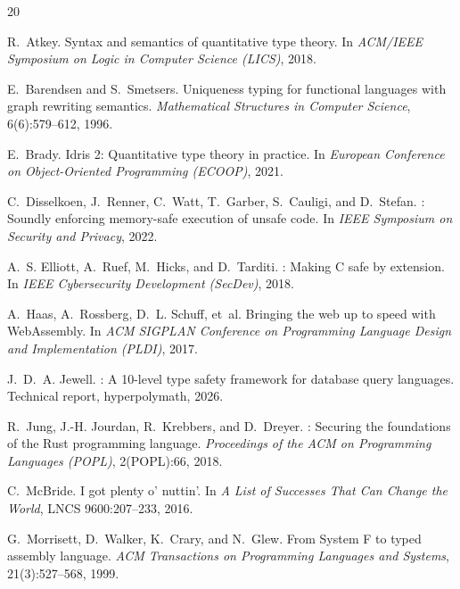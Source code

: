 \documentclass[11pt,a4paper]{article}
\begin{document}
\begin{thebibliography}{20}

R.~Atkey.
\newblock Syntax and semantics of quantitative type theory.
\newblock In \emph{ACM/IEEE Symposium on Logic in Computer Science (LICS)},
  2018.

E.~Barendsen and S.~Smetsers.
\newblock Uniqueness typing for functional languages with graph rewriting
  semantics.
\newblock \emph{Mathematical Structures in Computer Science}, 6(6):579--612,
  1996.

E.~Brady.
\newblock Idris 2: Quantitative type theory in practice.
\newblock In \emph{European Conference on Object-Oriented Programming (ECOOP)},
  2021.

C.~Disselkoen, J.~Renner, C.~Watt, T.~Garber, S.~Cauligi, and D.~Stefan.
: Soundly enforcing memory-safe execution of unsafe code.
\newblock In \emph{IEEE Symposium on Security and Privacy}, 2022.

A.~S. Elliott, A.~Ruef, M.~Hicks, and D.~Tarditi.
: Making {C} safe by extension.
\newblock In \emph{IEEE Cybersecurity Development (SecDev)}, 2018.

A.~Haas, A.~Rossberg, D.~L. Schuff, et~al.
\newblock Bringing the web up to speed with {WebAssembly}.
\newblock In \emph{ACM SIGPLAN Conference on Programming Language Design and
  Implementation (PLDI)}, 2017.

J.~D.~A. Jewell.
: A 10-level type safety framework for database query
  languages.
\newblock Technical report, hyperpolymath, 2026.

R.~Jung, J.-H. Jourdan, R.~Krebbers, and D.~Dreyer.
: Securing the foundations of the {Rust} programming
  language.
\newblock \emph{Proceedings of the ACM on Programming Languages (POPL)},
  2(POPL):66, 2018.

C.~McBride.
\newblock I got plenty o' nuttin'.
\newblock In \emph{A List of Successes That Can Change the World}, LNCS
  9600:207--233, 2016.

G.~Morrisett, D.~Walker, K.~Crary, and N.~Glew.
\newblock From {System F} to typed assembly language.
\newblock \emph{ACM Transactions on Programming Languages and Systems},
  21(3):527--568, 1999.


\end{thebibliography}
\end{document}
